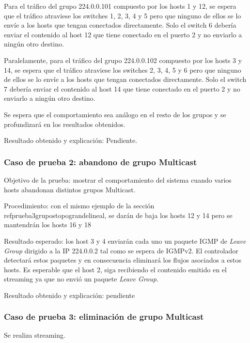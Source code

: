 \documentclass[12pt,a4paper,oneside]{book}
\begin{document}
Para el tráfico del grupo 224.0.0.101 compuesto por los hosts 1 y 12, se espera que el tráfico atraviese los switches 1, 2, 3, 4 y 5 pero que ninguno de ellos se lo envíe a los hosts que tengan conectados directamente. Solo el switch 6 debería enviar el contenido al host 12 que tiene conectado en el puerto 2 y no enviarlo a ningún otro destino.

Paralelamente, para el tráfico del grupo 224.0.0.102 compuesto por los hosts 3 y 14, se espera que el tráfico atraviese los switches 2, 3, 4, 5 y 6 pero que ninguno de ellos se lo envíe a los hosts que tengan conectados directamente. Solo el switch 7 debería enviar el contenido al host 14 que tiene conectado en el puerto 2 y no enviarlo a ningún otro destino.

Se espera que el comportamiento sea análogo en el resto de los grupos y se profundizará en los resultados obtenidos.

\vspace{0.5cm}
Resultado obtenido y explicación: 
Pendiente.

\subsubsection{Caso de prueba 2: abandono de grupo Multicast} 

Objetivo de la prueba: mostrar el comportamiento del sistema cuando varios hosts abandonan distintos grupos Multicast.

\vspace{0.5cm}
Procedimiento: con el mismo ejemplo de la sección ref{prueba3grupostopograndelineal}, se darán de baja los hosts 12 y 14 pero se mantendrán los hosts 16 y 18

\vspace{0.5cm}
Resultado esperado: los host 3 y 4 enviarán cada uno un paquete IGMP de \textit{Leave Group} dirigido a la IP 224.0.0.2 tal como se espera de IGMPv2. El controlador detectará estos paquetes y en consecuencia eliminará los flujos asociados a estos hosts. Es esperable que el host 2, siga recibiendo el contenido emitido en el streaming ya que no envió un paquete \textit{Leave Group}.

\vspace{0.5cm}
Resultado obtenido y explicación: pendiente



\subsubsection{Caso de prueba 3: eliminación de grupo Multicast} 
Se realiza streaming.
\end{document}
